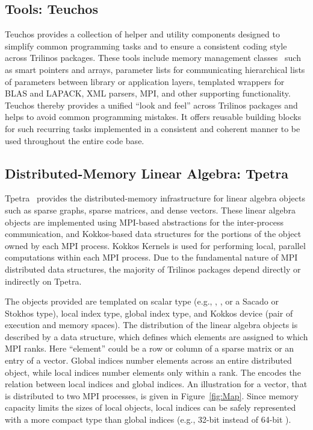\subsection{Tools: Teuchos}

Teuchos provides a collection of helper and utility components designed to simplify common programming tasks and to ensure a consistent coding style across Trilinos packages.
These tools include memory management classes~\cite{bartlett2010} such as smart pointers and arrays,
parameter lists for communicating hierarchical lists of parameters between library or application layers,
templated wrappers for BLAS and LAPACK, XML parsers, MPI, and other supporting functionality.
Teuchos thereby provides a unified ``look and feel'' across Trilinos packages and helps to avoid common programming mistakes.
It offers reusable building blocks for such recurring tasks implemented in a consistent and coherent manner to be used throughout the entire code base.

\subsection{Distributed-Memory Linear Algebra: Tpetra}\label{subsec:tpetra}
Tpetra~\cite{Baker2012,hoemmen2015tpetra} provides the distributed-memory
infrastructure for linear algebra objects such as sparse graphs,
sparse matrices, and dense vectors. These linear algebra objects are
implemented using MPI-based abstractions for the inter-process communication,
and Kokkos-based data structures for the portions of the object
owned by each MPI process. Kokkos Kernels is used for
performing local, parallel computations within each MPI process.
Due to the fundamental nature of MPI distributed data structures, the majority of Trilinos packages depend directly or indirectly on Tpetra.

The objects provided are templated on scalar type (e.g., , , or a Sacado or Stokhos type), local index type, global index type, and Kokkos device (pair of execution and memory spaces).
The distribution of the linear algebra objects is described by a  data structure,
which defines which elements are assigned to which MPI ranks.
Here ``element'' could be a row or column of a sparse matrix or an entry of a vector.
Global indices number elements across an entire distributed object, while local indices number elements only within a rank.
The  encodes the relation between local indices and global indices.
An illustration for a vector, that is distributed to two MPI processes, is given in Figure~\ref{fig:Map}.
Since memory capacity limits the sizes of local objects, local indices can be safely represented with a more compact type than global indices (e.g., 32-bit  instead of 64-bit ).

